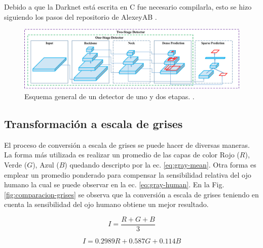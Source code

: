 Debido a que la Darknet está escrita en C fue necesario compilarla, esto se hizo siguiendo los pasos del repositorio de AlexeyAB \cite{alexey_yolo_2023}.


\begin{figure}[bth]
    \centering
    \includegraphics[width=\textwidth]{imgs/funcionamiento-yolo.png}
    \caption{Esquema general de un detector de uno y dos etapas. \cite{bochkovskiy_yolov4_2020}.}
    \label{fig:funcionamiento-yolo}
\end{figure}

\subsection{Transformación a escala de grises}

El proceso de conversión a escala de grises se puede hacer de diversas maneras. La forma más utilizada es realizar un promedio de las capas de color Rojo ($R$), Verde ($G$), Azul ($B$) quedando descripto por la ec. \ref{eq:gray-mean}.
Otra forma es emplear un promedio ponderado para compensar la sensibilidad relativa del ojo humano la cual se puede observar en la ec. \ref{eq:gray-human}. En la Fig. \ref{fig:comparacion-grises} se observa que la conversión a escala de grises teniendo en cuenta la sensibilidad del ojo humano obtiene un mejor resultado.

\begin{equation}
    \label{eq:gray-mean}
    I = \frac{R + G + B}{3}
\end{equation}

\begin{equation}
    \label{eq:gray-human}
    I = 0.2989R + 0.587G + 0.114B
\end{equation}

